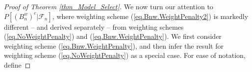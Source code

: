 \documentclass[ejs,authoryear,linksfromyear]{imsart}
\newcommand{\znwa}{\bm{Z}_{n(1)}^w}
\newcommand{\znwc}{\bm{Z}_{n(3)}^w}
\numberwithin{equation}{section}
\theoremstyle{plain}
\begin{document}
\begin{proof}[Proof of Theorem \ref{thm_Model_Select}]
	We now turn our attention to $P \left[ \left( B_n^w \right)^c \big\vert \mathcal{F}_n \right]$, where weighting scheme (\ref{eq.Bnw.WeightPenalty2}) is markedly different -- and derived separately -- from weighting schemes (\ref{eq.NoWeightPenalty}) and (\ref{eq.Bnw.WeightPenalty}). We first consider weighting scheme (\ref{eq.Bnw.WeightPenalty}), and then infer the result for weighting scheme (\ref{eq.NoWeightPenalty}) as a special case. For ease of notation, define

\end{proof}
\end{document}

